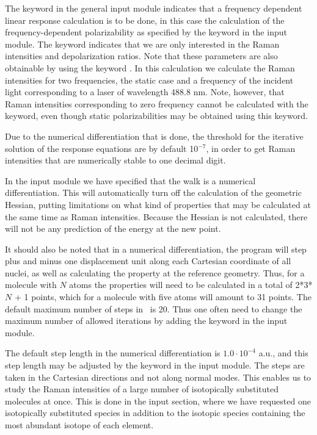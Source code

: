 The keyword  in the general input module indicates that
a frequency dependent linear response
calculation is to be done, in
this case the calculation of the frequency-dependent
polarizability as
specified by the  keyword in the  input
module. The keyword  indicates that we are only
interested in the Raman intensities and
depolarization ratios. Note
that these parameters are also obtainable by using the keyword
. In this calculation we calculate the Raman intensities for two
frequencies, the static case and a frequency of the incident light
corresponding to a laser of wavelength 488.8 nm. Note, however, that
Raman intensities corresponding to zero frequency cannot be calculated
with the  keyword, even though static
polarizabilities may be obtained using this keyword.

Due to the numerical differentiation
that is done, the threshold for
the iterative solution of the response equations are by default
10$^{-7}$, in order to get Raman intensities that are numerically
stable to one decimal digit.

In the  input module we have specified
that the walk is a numerical differentiation. This will automatically
turn off the calculation of the geometric Hessian,
putting limitations
on what kind of properties that may be calculated at the same time as
Raman intensities. Because the Hessian is not calculated,
there will not be any prediction of the energy at the new
point.

It should also be noted that  in a numerical
differentiation, the
program will
step plus and minus one displacement unit along each Cartesian coordinate
of all nuclei, as well as calculating the property at the reference
geometry. Thus, for a molecule with $N$ atoms the properties will need
to be calculated in a total of 2*3*$N$ + 1 points, which for a 
molecule with five atoms will amount to 31 points. The default maximum number of
steps in \siraba\ is 20. Thus one often need to
change the maximum number of allowed iterations by adding the keyword
 in the  input module.

The default step length in the numerical
differentiation is $1.0\cdot 10^{-4}$
a.u., and this step length may be adjusted by the keyword
 in the  input module. The steps are taken
in the Cartesian directions and
not along normal modes. This enables us to study the Raman intensities
of a large number of isotopically substituted molecules at once. This
is done in the  input section, where we
have requested one isotopically substituted species in addition to the
isotopic species containing the most abundant isotope of each element.


